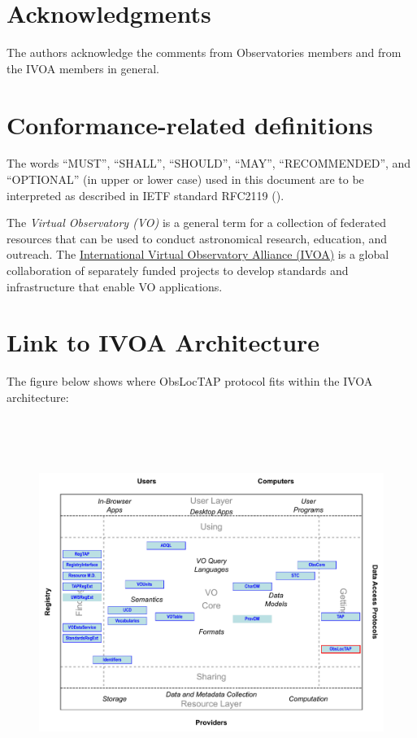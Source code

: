 \documentclass[11pt,a4paper]{ivoa}
\begin{document}
\section*{Acknowledgments}
The authors acknowledge the comments from Observatories members and from the IVOA members in general.


\section*{Conformance-related definitions}

The words ``MUST'', ``SHALL'', ``SHOULD'', ``MAY'', ``RECOMMENDED'', and
``OPTIONAL'' (in upper or lower case) used in this document are to be
interpreted as described in IETF standard RFC2119 (\citep{std:RFC2119}).

The \emph{Virtual Observatory (VO)} is a
general term for a collection of federated resources that can be used
to conduct astronomical research, education, and outreach.
The \href{http://www.ivoa.net}{International
Virtual Observatory Alliance (IVOA)} is a global
collaboration of separately funded projects to develop standards and
infrastructure that enable VO applications.

\section*{Link to IVOA Architecture}
The figure below shows where ObsLocTAP protocol fits within the IVOA architecture:


\begin{figure}[H]
\advance\leftskip 0.0in		\includegraphics[width=6.0in,height=4.73in]{./role_diagram.pdf}
\end{figure}
\end{document}
